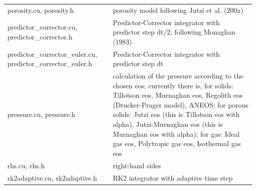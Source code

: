 \documentclass[10pt,fleqn,twoside]{article}
\begin{document}
\begin{table}
\begin{tabular}[b]{p{6cm} p{9cm}}
  porosity.cu, porosity.h                                       & porosity model following Jutzi et al. (200x)                                                                                                                                                                                                                                                                                                               \\
  predictor\_corrector.cu, predictor\_corrector.h               & Predictor-Corrector integrator with predictor step dt/2, following Monaghan (1983)                                                                                                                                                                                                                                                                         \\
  predictor\_corrector\_euler.cu, predictor\_corrector\_euler.h & Predictor-Corrector integrator with predictor step dt                                                                                                                                                                                                                                                                                                      \\
  pressure.cu, pressure.h                                       & calculation of the pressure according to the chosen eos; currently there is, for solids: Tillotson eos, Murnaghan eos, Regolith eos (Drucker-Prager model), ANEOS; for porous solids: Jutzi eos (this is Tillotson eos with alpha), Jutzi-Murnaghan eos (this is Murnaghan eos with alpha); for gas: Ideal gas eos, Polytropic gas eos, Isothermal gas eos \\
  rhs.cu, rhs.h                                                 & right-hand sides                                                                                                                                                                                                                                                                                                                                           \\
  rk2adaptive.cu, rk2adaptive.h                                 & RK2 integrator with adaptive time step                                                                                                                                                                                                                                                                                                                     \\

\end{tabular}
\end{table}
\end{document}

